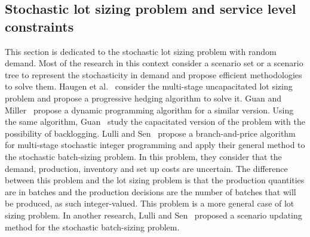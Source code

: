 \documentclass[11pt]{article}
\begin{document}
\subsection{Stochastic lot sizing problem and service level constraints}
This section is dedicated to the stochastic lot sizing problem with random demand. Most of the research in this context consider a scenario set or a scenario tree to represent the stochasticity in demand and propose efficient methodologies to solve them. Haugen et al.~\cite{haugen2001progressive} consider the multi-stage uncapacitated lot sizing problem and propose a progressive hedging algorithm to solve it. Guan and Miller~\cite{guan2008polynomial} propose a dynamic programming algorithm for a similar version. Using the same algorithm, Guan~\cite{guan2011stochastic} study the capacitated version of the problem with the possibility of backlogging. Lulli and Sen~\cite{lulli2004branch} propose a branch-and-price algorithm for multi-stage stochastic integer programming and apply their general method to the stochastic batch-sizing problem. In this problem, they consider that the demand, production, inventory and set up costs are uncertain. The difference between this problem and the lot sizing problem is that the production quantities are in batches and the production decisions are the number of batches that will be produced, as such integer-valued. This problem is a more general case of lot sizing problem. In another research, Lulli and Sen~\cite{lulli2004branch}  proposed a scenario updating method for the stochastic batch-sizing problem.
\end{document}
